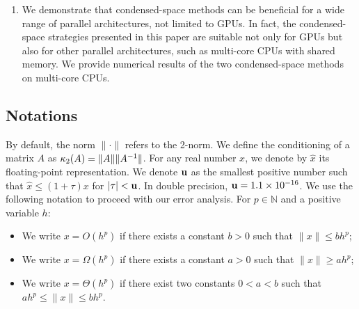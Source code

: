 \begin{enumerate}
\item We demonstrate that condensed-space methods can be beneficial for a wide range of parallel architectures, not limited to GPUs. In fact, the condensed-space strategies presented in this paper are suitable not only for GPUs but also for other parallel architectures, such as multi-core CPUs with shared memory. We provide numerical results of the two condensed-space methods on multi-core CPUs. 
\end{enumerate}

\subsection{Notations}
By default, the norm $\|\cdot\|$ refers to the 2-norm.
We define the conditioning of a matrix $A$ as $\kappa_2(A) = \| A \| \|A^{-1} \|$.
For any real number $x$, we denote by $\widehat{x}$ its floating-point representation.
We denote $\mathbf{u}$ as the smallest positive number such that $\widehat{x} \leq (1 + \tau) x$ for $|\tau| < \mathbf{u}$.
In double precision, $\mathbf{u} = 1.1 \times 10^{-16}$.
We use the following notation to proceed with our error analysis.
For $p \in \mathbb{N}$ and a positive variable $h$:
\begin{itemize}
  \item We write $x = O(h^p)$ if there exists a constant $b > 0$ such that $\| x \| \leq b h^p$;
  \item We write $x = \Omega(h^p)$ if there exists a constant $a > 0$ such that $\| x \| \geq a h^p$;
  \item We write $x = \Theta(h^p)$ if there exist two constants $0 < a < b$ such that $a h^p \leq \| x \| \leq b h^p$.
\end{itemize}

